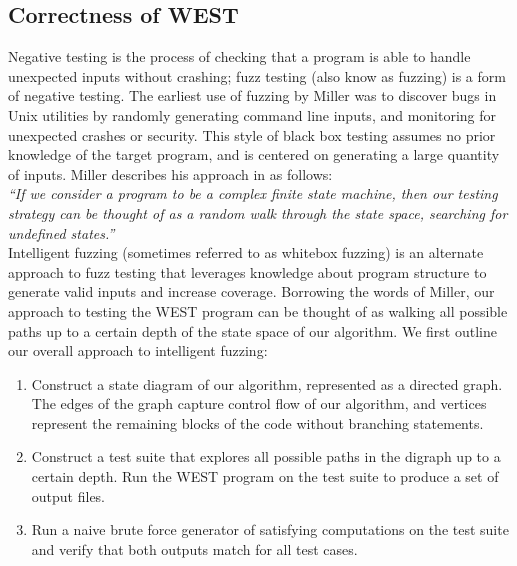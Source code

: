 \documentclass[runningheads]{llncs}
\begin{document}
\subsection{Correctness of WEST}
 Negative testing is the process of checking that a program is able to handle unexpected inputs without crashing; fuzz testing (also know as fuzzing) is a form of negative testing.
The earliest use of fuzzing by Miller \cite{Miller} was to discover bugs in Unix utilities by randomly generating command line inputs, and monitoring for unexpected crashes or security. This style of black box testing assumes no prior knowledge of the target program, and is centered on generating a large quantity of inputs. Miller describes his approach in \cite{Miller} as follows: \\
 \textit{``If we consider a program to
be a complex finite state machine, then our testing strategy can be thought of as a random walk through the state space, searching for undefined states.''} \\
Intelligent fuzzing (sometimes referred to as whitebox fuzzing) is an alternate approach to fuzz testing that leverages knowledge about program structure to generate valid inputs and increase coverage. 
Borrowing the words of Miller, our approach to testing the WEST program can be thought of as walking all possible paths up to a certain depth of the state space of our algorithm. 
We first outline our overall approach to intelligent fuzzing: 
\begin{enumerate}
    \item Construct a state diagram of our algorithm, represented as a directed graph. 
    The edges of the graph capture control flow of our algorithm, and vertices represent the remaining blocks of the code without branching statements.  
    \item Construct a test suite that explores all possible paths in the digraph up to a certain depth. Run the WEST program on the test suite to produce a set of output files.
    \item Run a naive brute force generator of satisfying computations on the test suite and verify that both outputs match for all test cases.
\end{enumerate}
\end{document}
